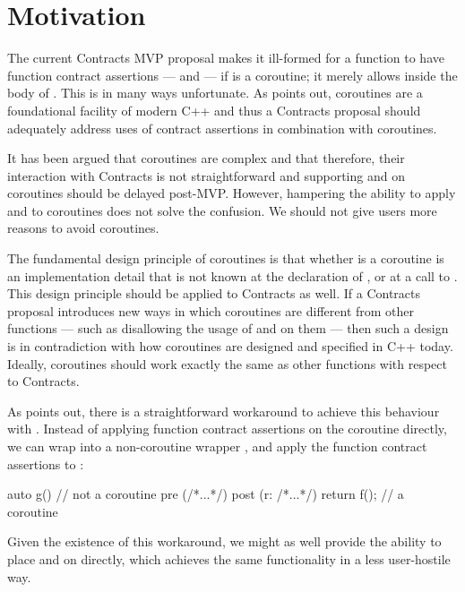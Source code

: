 

\section{Motivation}
\label{intro}

The current Contracts MVP proposal \cite{P2900R8} makes it ill-formed for a function  to have function contract assertions ---  and  --- if  is a coroutine; it merely allows  inside the body of . This is in many ways unfortunate. As \cite{P3173R0} points out, coroutines are a foundational facility of modern C++ and thus a Contracts proposal should adequately address uses of contract assertions in combination with coroutines.

It has been argued that coroutines are complex and that therefore, their interaction with Contracts is not straightforward and supporting  and  on coroutines should be delayed post-MVP. However, hampering the ability to apply  and  to coroutines does not solve the confusion. We should not give users more reasons to avoid coroutines.

The fundamental design principle of coroutines is that whether  is a coroutine is an implementation detail that is not known at the declaration of , or at a call to . This design principle should be applied to Contracts as well. If a Contracts proposal introduces new ways in which coroutines are different from other functions --- such as disallowing the usage of  and  on them --- then such a design is in contradiction with how coroutines are designed and specified in C++ today. Ideally, coroutines should work exactly the same as other functions with respect to Contracts.

As \cite{P3251R0} points out, there is a straightforward workaround to achieve this behaviour with \cite{P2900R8}. Instead of applying function contract assertions on the coroutine  directly, we can wrap  into a non-coroutine wrapper , and apply the function contract assertions to :
\begin{codeblock}
auto g()  // not a coroutine
pre (/*...*/) 
post (r: /*...*/) { 
  return f();  // a coroutine
} 
\end{codeblock}
Given the existence of this workaround, we might as well provide the ability to place  and  on  directly, which achieves the same functionality in a less user-hostile way.

